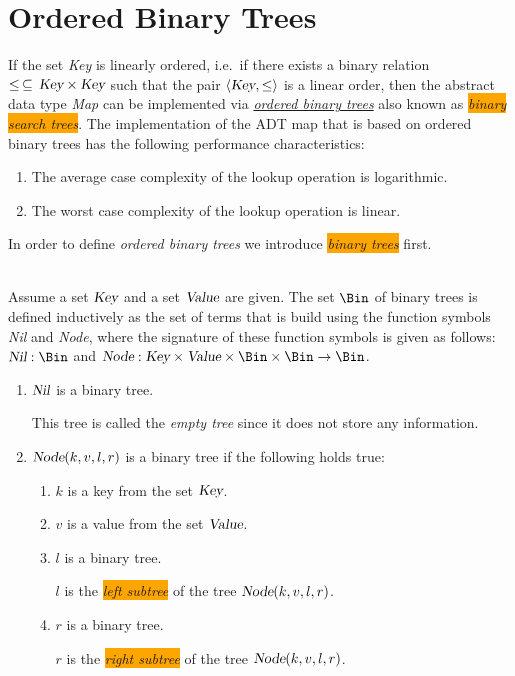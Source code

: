 \section{Ordered Binary Trees}
If the set \textsl{Key} is linearly ordered, i.e.~if there exists a binary relation
$\leq \,\subseteq\,\textsl{Key}\times\textsl{Key}$ such that the pair $\langle \textsl{Key}, \leq \rangle$ is a linear
order, then the abstract data type \textsl{Map} can be implemented via  
\href{https://en.wikipedia.org/wiki/Binary_search_tree}{\emph{ordered binary trees}} also known as
\colorbox{orange}{\emph{binary search trees}}. 
The implementation of the ADT map that is based on ordered binary trees has the following performance
characteristics: 
\begin{enumerate}
\item The average case complexity of the lookup operation is logarithmic.
\item The worst case complexity of the lookup operation is linear.  
\end{enumerate}
In order to define \emph{ordered binary trees} we introduce
\colorbox{orange}{\emph{binary trees}} first.

\begin{Definition} \hspace*{\fill} \\
  Assume a set $\textsl{Key}$ and a set $\textsl{Value}$ are given.
  The set $\Bin$ of binary trees is defined inductively as the set of terms that is build using the
  function symbols \textsl{Nil} and \textsl{Node}, where the signature of these function symbols is
  given as follows: \\[0.1cm]
  \hspace*{1.3cm} 
  $\textsl{Nil}: \Bin$ \qquad and \qquad  $\textsl{Node}: \textsl{Key} \times \textsl{Value} \times \Bin \times \Bin \rightarrow \Bin$.
  \begin{enumerate}
  \item $\textsl{Nil}$ is a binary tree.

        This tree is called the \emph{empty tree} since it does not store any information.
  \item $\textsl{Node}(k, v, l, r)$ is a binary tree if the following holds true: 
        \begin{enumerate}
        \item $k$ is a key from the set $\textsl{Key}$.
        \item $v$ is a value from the set $\textsl{Value}$.
        \item $l$ is a binary tree.

              $l$ is the  \colorbox{orange}{\emph{left subtree}} of the tree $\textsl{Node}(k, v, l, r)$.
        \item $r$ is a binary tree.

              $r$ is the \colorbox{orange}{\emph{right subtree}} of the tree $\textsl{Node}(k, v, l, r)$.
              \eox
        \end{enumerate}
  \end{enumerate}
\end{Definition}

